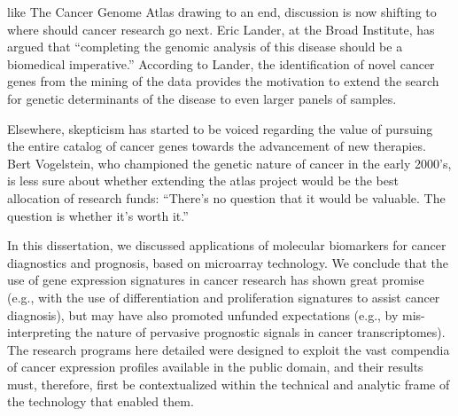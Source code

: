 \label{life-discussion}



 like The Cancer Genome Atlas drawing to an end,
discussion is now shifting to where should cancer research go next.  Eric
Lander, at the Broad Institute, has argued that ``completing the genomic
analysis of this disease should be a biomedical
imperative.''\cite{lawrence_discovery_2014} According to Lander, the
identification of novel cancer genes from the mining of the 
data provides the motivation to extend the search for genetic determinants of
the disease to even larger panels of samples.

Elsewhere, skepticism has started to be voiced regarding the value of pursuing
the entire catalog of cancer genes towards the advancement of new therapies.
Bert Vogelstein, who championed the genetic nature of cancer in the early
2000's, is less sure about whether extending the atlas project would be the best
allocation of research funds: ``There’s no question that it would be
valuable. The question is whether it’s worth it.''\cite{zimmer_catalog_2014}

\medskip

In this dissertation, we discussed applications of molecular biomarkers for
cancer diagnostics and prognosis, based on microarray technology.  We conclude
that the use of gene expression signatures in cancer research has shown great
promise (e.g., with the use of differentiation and proliferation signatures to
assist cancer diagnosis), but may have also promoted unfunded expectations
(e.g., by mis-interpreting the nature of pervasive prognostic signals in cancer
transcriptomes).  The research programs here detailed were designed to exploit
the vast compendia of cancer expression profiles available in the public
domain, and their results must, therefore, first be contextualized within the
technical and analytic frame of the technology that enabled them.

